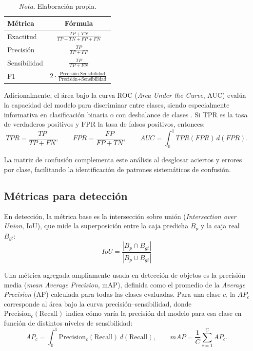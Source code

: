 \begin{table}[h]
    \centering
    \caption{Métricas de clasificación}
    \label{tab:metricas-clasificacion-formulas}
    \small
    \renewcommand{\arraystretch}{1.6}
    \begin{tabular}{l c}
    \toprule
    \textbf{Métrica} & \textbf{Fórmula} \\
    \midrule
    Exactitud      & $\displaystyle \frac{TP+TN}{TP+TN+FP+FN}$ \\[2mm]
    Precisión      & $\displaystyle \frac{TP}{TP+FP}$ \\[2mm]
    Sensibilidad   & $\displaystyle \frac{TP}{TP+FN}$ \\[2mm]
    F1             & $\displaystyle 2\cdot\frac{\text{Precisión}\cdot\text{Sensibilidad}}{\text{Precisión}+\text{Sensibilidad}}$ \\
    \bottomrule
    \end{tabular}
    \caption*{\normalfont\normalsize\textit{Nota.} Elaboración propia.}
\end{table}

Adicionalmente, el área bajo la curva ROC (\textit{Area Under the Curve}, AUC) evalúa la capacidad del modelo para discriminar entre clases, siendo especialmente informativa en clasificación binaria o con desbalance de clases \parencite{parvin2020breast}. Si $\mathrm{TPR}$ es la tasa de verdaderos positivos y $\mathrm{FPR}$ la tasa de falsos positivos, entonces:
\[
TPR=\frac{TP}{TP+FN},
\qquad
FPR=\frac{FP}{FP+TN},
\qquad
AUC=\int_{0}^{1} TPR(FPR)\, d(FPR).
\]

La matriz de confusión complementa este análisis al desglosar aciertos y errores por clase, facilitando la identificación de patrones sistemáticos de confusión.

\subsection{Métricas para detección}

En detección, la métrica base es la intersección sobre unión (\textit{Intersection over Union}, IoU), que mide la superposición entre la caja predicha $B_p$ y la caja real $B_{gt}$: 
\[
IoU=\frac{|B_p\cap B_{gt}|}{|B_p\cup B_{gt}|}
\]

Una métrica agregada ampliamente usada en detección de objetos es la precisión media  (\textit{mean Average Precision}, mAP), definida como el promedio de la \textit{Average Precision} (AP) calculada para todas las clases evaluadas. Para una clase  $c$, la $AP_c$ corresponde al área bajo la curva precisión--sensibilidad, donde  $\text{Precision}_c(\text{Recall})$ indica cómo varía la precisión del modelo para esa clase en función de distintos niveles de sensibilidad:
\[
AP_c = \int_{0}^{1} \text{Precision}_c(\text{Recall}) \, d(\text{Recall}),
\qquad
mAP = \frac{1}{C}\sum_{c=1}^{C} AP_c.
\]

